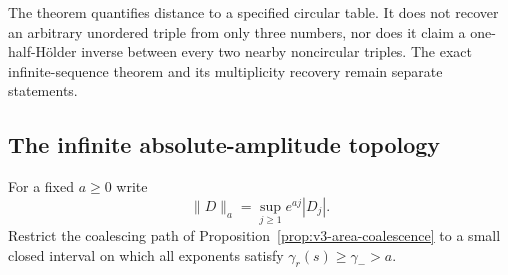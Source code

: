 The theorem quantifies distance to a specified circular table. It
does not recover an arbitrary unordered triple from only three
numbers, nor does it claim a one-half-H\"older inverse between every
two nearby noncircular triples. The exact infinite-sequence theorem
and its multiplicity recovery remain separate statements.

\subsection{The infinite absolute-amplitude topology}
For a fixed $a\ge0$ write
\begin{equation}\label{eq:v4-sequence-norm}
 \|D\|_a=\sup_{j\ge1}e^{aj}|D_j|.
\end{equation}
Restrict the coalescing path of
Proposition~\ref{prop:v3-area-coalescence} to a small closed interval
on which all exponents satisfy $\gamma_r(s)\ge\gamma_->a$.


